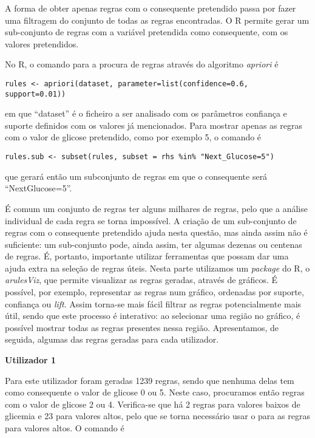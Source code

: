A forma de obter apenas regras com o consequente pretendido passa por fazer uma filtragem do conjunto de todas as regras encontradas. O R permite gerar um sub-conjunto de regras com a variável pretendida como consequente, com os valores pretendidos.


No R, o comando para a procura de regras através do algoritmo \textit{apriori} é

\begin{lstlisting}
rules <- apriori(dataset, parameter=list(confidence=0.6, support=0.01))
\end{lstlisting}
em que ``dataset'' é o ficheiro a ser analisado com os parâmetros confiança e suporte definidos com os valores já mencionados. Para mostrar apenas as regras com o valor de glicose pretendido, como por exemplo 5, o comando é

\begin{lstlisting}
rules.sub <- subset(rules, subset = rhs %in% "Next_Glucose=5")
\end{lstlisting}
que gerará então um subconjunto de regras em que o consequente será ``Next\textunderscore Glucose=5''.

É comum um conjunto de regras ter alguns milhares de regras, pelo que a análise individual de cada regra se torna impossível. A criação de um sub-conjunto de regras com o consequente pretendido ajuda nesta questão, mas ainda assim não é suficiente: um sub-conjunto pode, ainda assim, ter algumas dezenas ou centenas de regras. É, portanto, importante utilizar ferramentas que possam dar uma ajuda extra na seleção de regras úteis. Nesta parte utilizamos um \textit{package} do R, o \textit{arulesViz}, que permite visualizar as regras geradas, através de gráficos. É possível, por exemplo, representar as regras num gráfico, ordenadas por suporte, confiança ou \textit{lift}. Assim torna-se mais fácil filtrar as regras potencialmente mais útil, sendo que este processo é interativo: ao selecionar uma região no gráfico, é possível mostrar todas as regras presentes nessa região. 
Apresentamos, de seguida, algumas das regras geradas para cada utilizador.

\textbf{Utilizador 1}

Para este utilizador foram geradas 1239 regras, sendo que nenhuma delas tem como consequente o valor de glicose 0 ou 5. Neste caso, procuramos então regras com o valor de glicose 2 ou 4. Verifica-se que há 2 regras para valores baixos de glicemia e 23 para valores altos, pelo que se torna necessário usar o  para as regras para valores altos. O comando é

